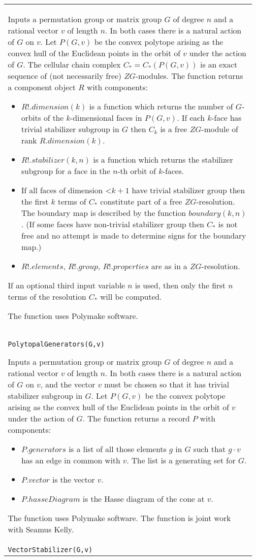 \documentclass[a4paper,11pt]{report}
\begin{document}
{\begin{center}
\begin{tabular}{|l|}
 Inputs a permutation group or matrix group $G$ of degree $n$ and a rational vector $v$ of length $n$. In both cases there is a natural action of $G$ on $v$. Let $P(G,v)$ be the convex polytope arising as the convex hull of the Euclidean points in
the orbit of $v$ under the action of $G$. The cellular chain complex $C_*=C_*(P(G,v))$ is an exact sequence of (not necessarily free) $ZG$-modules. The function returns a component object $R$ with components: 
\begin{itemize}
\item  $R!.dimension(k)$ is a function which returns the number of $G$-orbits of the $k$-dimensional faces in $P(G,v)$. If each $k$-face has trivial stabilizer subgroup in $G$ then $C_k$ is a free $ZG$-module of rank $R.dimension(k)$. 
\item  $R!.stabilizer(k,n)$ is a function which returns the stabilizer subgroup for a face in the $n$-th orbit of $k$-faces. 
\item  If all faces of dimension {\textless}$k+1$ have trivial stabilizer group then the first $k$ terms of $C_*$ constitute part of a free $ZG$-resolution. The boundary map is described by the function $boundary(k,n)$ . (If some faces have non-trivial stabilizer group then $C_*$ is not free and no attempt is made to determine signs for the boundary map.) 
\item  $R!.elements$, $R!.group$, $R!.properties$ are as in a $ZG$-resolution. 
\end{itemize}
 If an optional third input variable $n$ is used, then only the first $n$ terms of the resolution $C_*$ will be computed. 

 The function uses Polymake software. \\
 \index{PolytopalGenerators} \texttt{PolytopalGenerators(G,v) } 

 Inputs a permutation group or matrix group $G$ of degree $n$ and a rational vector $v$ of length $n$. In both cases there is a natural action of $G$ on $v$, and the vector $v$ must be chosen so that it has trivial stabilizer subgroup in $G$. Let $P(G,v)$ be the convex polytope arising as the convex hull of the Euclidean points in
the orbit of $v$ under the action of $G$. The function returns a record $P$ with components: 
\begin{itemize}
\item  $P.generators$ is a list of all those elements $g$ in $G$ such that $g\cdot v$ has an edge in common with $v$. The list is a generating set for $G$.
\item  $P.vector$ is the vector $v$.
\item $P.hasseDiagram$ is the Hasse diagram of the cone at $v$. 
\end{itemize}
 The function uses Polymake software. The function is joint work with Seamus
Kelly. \\
 \index{VectorStabilizer} \texttt{VectorStabilizer(G,v) } 


\end{tabular}
\end{center}}
\end{document}
